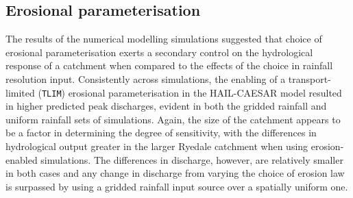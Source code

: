 \subsection{Erosional parameterisation}
The results of the numerical modelling simulations suggested that choice of erosional parameterisation exerts a secondary control on the hydrological response of a catchment when compared to the effects of the choice in rainfall resolution input. Consistently across simulations, the enabling of a transport-limited (\texttt{TLIM}) erosional parameterisation in the HAIL-CAESAR model resulted in higher predicted peak discharges, evident in both the gridded rainfall and uniform rainfall sets of simulations. Again, the size of the catchment appears to be a factor in determining the degree of sensitivity, with the differences in hydrological output greater in the larger Ryedale catchment when using erosion-enabled simulations. The differences in discharge, however, are relatively smaller in both cases and any change in discharge from varying the choice of erosion law is surpassed by using a gridded rainfall input source over a spatially uniform one.

